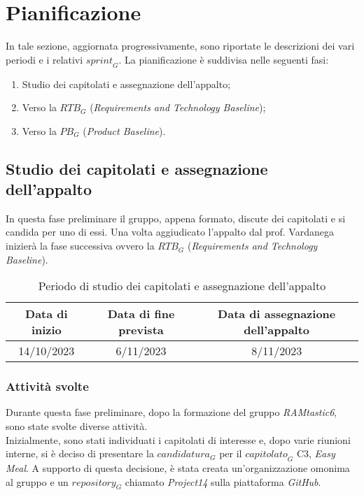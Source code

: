 \section{Pianificazione}
In tale sezione, aggiornata progressivamente, sono riportate le descrizioni dei vari periodi e i relativi $\textit{sprint}_G$.
La pianificazione è suddivisa nelle seguenti fasi:
\begin{enumerate}
    \item Studio dei capitolati e assegnazione dell'appalto;
    \item Verso la $\textit{RTB}_G$ (\emph{Requirements and Technology Baseline});
    \item Verso la $\textit{PB}_G$ (\emph{Product Baseline}).
\end{enumerate}

\subsection{Studio dei capitolati e assegnazione dell'appalto}
In questa fase preliminare il gruppo, appena formato, discute dei capitolati e si candida per uno di essi. Una volta aggiudicato l'appalto dal prof. Vardanega inizierà la fase successiva ovvero la $\textit{RTB}_G$ (\emph{Requirements and Technology Baseline}).

\begin{table}[h]
\centering
\captionsetup{justification=centering}

\begin{tabular}{|c|c|c|}
\hline
\textbf{Data di inizio} & \textbf{Data di fine prevista} & \textbf{Data di assegnazione dell'appalto} \\
\hline
14/10/2023 & 6/11/2023 & 8/11/2023 \\
\hline
\end{tabular}
\caption{Periodo di studio dei capitolati e assegnazione dell'appalto}
\end{table}

\subsubsection{Attività svolte}
Durante questa fase preliminare, dopo la formazione del gruppo \emph{RAMtastic6}, sono state svolte diverse attività. \\
Inizialmente, sono stati individuati i capitolati di interesse e, dopo varie riunioni interne, si è deciso di presentare la $\textit{candidatura}_G$ per il $\textit{capitolato}_G$ C3, \emph{Easy Meal}. A supporto di questa decisione, è stata creata un'organizzazione omonima al gruppo e un $\textit{repository}_G$ chiamato \emph{Project14} sulla piattaforma \emph{GitHub}. 

